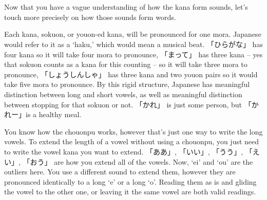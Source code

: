 \section[伯]{}\label{sec:PR;仮名;伯}

Now that you have a vague understanding of how the kana form sounds, let's touch more precisely on how those sounds form words.

Each kana, sokuon, or youon-ed kana, will be pronounced for one mora. Japanese would refer to it as a `haku,' which would mean a musical beat. 「ひらがな」 has four kana so it will take four mora to pronounce, 「まって」 has three kana -- yes that sokuon counts as a kana for this counting -- so it will take three mora to pronounce, 「しょうしんしゃ」 has three kana and two youon pairs so it would take five mora to pronounce. By this rigid structure, Japanese has meaningful distinction between long and short vowels, as well as meaningful distinction between stopping for that sokuon or not. 「かれ」 is just some person, but 「かれー」is a healthy meal.

You know how the chouonpu works, however that's just one way to write the long vowels. To extend the length of a vowel without using a chouonpu, you just need to write the vowel kana you want to extend. 「ああ」, 「いい」, 「うう」, 「えい」, 「おう」 are how you extend all of the vowels. Now, `ei' and `ou' are the outliers here. You use a different sound to extend them, however they are pronounced identically to a long `e' or a long `o'. Reading them as is and gliding the vowel to the other one, or leaving it the same vowel are both valid readings.
